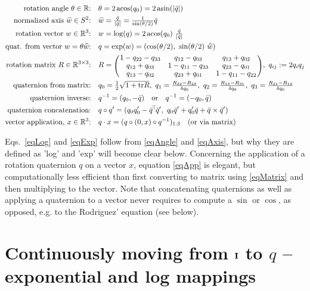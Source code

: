\begin{align}
\text{rotation angle $\t\in\RRR$:} \quad \label{eqAngle}
& \t = 2 \acos(q_0) = 2\, \text{asin}(|\bar q|) \\
\text{normalized axis $\ul w\in S^2$:} \quad \label{eqAxis}
& \ul w = \Frac{\bar q}{|\bar q|} = \Frac{1}{\sin(\t/2)} \bar q \\
\text{rotation vector $w\in\RRR^3$:} \quad \label{eqLog}
& w = \log(q) = 2 \acos(q_0)~ \Frac{\bar q}{|\bar q|}  \\
\text{quat. from vector $w=\t\ul w$:} \quad \label{eqExp}
& q = \exp(w) = (\cos(\t/2),~ \sin(\t/2)~ \ul w) \\
\text{rotation matrix $R\in\RRR^{3\times 3}$:} \quad \label{eqMatrix}
& R
= \mat{ccc}{
    1-q_{22}-q_{33} & q_{12}-q_{03} &    q_{13}+q_{02} \\
    q_{12}+q_{03} &   1-q_{11}-q_{33} &  q_{23}-q_{01} \\
    q_{13}-q_{02} &   q_{23}+q_{01} &    1-q_{11}-q_{22}
    },~ q_{ij} := 2 q_i q_j \\
\text{quaternion from matrix:} \quad
& q_0 = \Frac12 \sqrt{1+\tr R},~
  q_1 = \Frac{R_{32}-R_{23}}{4 q_0},~
  q_2 = \Frac{R_{13}-R_{31}}{4 q_0},~
  q_3 = \Frac{R_{21}-R_{12}}{4 q_0}  \\
\text{quaternion inverse:} \quad
& q^{-1} = (q_0,-\bar q) \quad \text{or} \quad  q^{-1} = (-q_0, \bar q) \\
\text{quaternion concatenation:} \quad &
q \circ q'
 = (q_0 q'_0 - \bar q^\T \bar q',~
    q_0 \bar q' + q'_0 \bar q + \bar q \times \bar q') \\
\text{vector application, $x\in\RRR^3$:} \quad \label{eqApp}
& q \cdot x = (q \circ (0,x) \circ q^{-1})_{1:3} \quad\text{(or via matrix)}
\end{align}

Eqs.~\eqref{eqLog} and \eqref{eqExp} follow from \eqref{eqAngle}
and \eqref{eqAxis}, but why they are defined as 'log' and 'exp' will become clear below. Concerning the application of a rotation quaternion $q$ on a vector
$x$, equation \eqref{eqApp} is elegant, but computationally less
efficient than first converting to matrix using \eqref{eqMatrix} and
then multiplying to the vector. Note that concatenating quaternions as
well as applying a quaternion to a vector never requires to compute
a $\sin$ or $\cos$, as opposed, e.g. to the Rodriguez' equation
(see below).

\section{Continuously moving from ${\rm\bf I}$ to $q$ -- exponential and log mappings}

